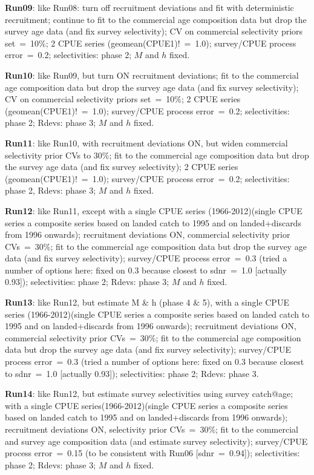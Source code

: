 {\bf Run09}: like Run08: turn off recruitment deviations and fit with deterministic recruitment; continue to fit to the commercial age composition data but drop the survey age data (and fix survey selectivity); CV on commercial selectivity priors set~=~10\%; 2 CPUE series (geomean(CPUE1)!~=~1.0); survey/CPUE process error~=~0.2; selectivities: phase 2; $M$ and $h$ fixed. \newline

{\bf Run10}: like Run09, but turn ON recruitment deviations; fit to the commercial age composition data but drop the survey age data (and fix survey selectivity); CV on commercial selectivity priors set~=~10\%; 2 CPUE series (geomean(CPUE1)!~=~1.0); survey/CPUE process error~=~0.2; selectivities: phase 2; Rdevs: phase 3; $M$ and $h$ fixed. \newline

{\bf Run11}: like Run10, with recruitment deviations ON, but widen commercial selectivity prior CVs to 30\%; fit to the commercial age composition data but drop the survey age data (and fix survey selectivity); 2 CPUE series (geomean(CPUE1)!~=~1.0); survey/CPUE process error~=~0.2; selectivities: phase 2, Rdevs: phase 3; $M$ and $h$ fixed. \newline

{\bf Run12}: like Run11, except with a single CPUE series (1966-2012)(single CPUE series a composite series based on landed catch to 1995 and on landed+discards from 1996 onwards); recruitment deviations ON, commercial selectivity prior CVs~=~30\%; fit to the commercial age composition data but drop the survey age data (and fix survey selectivity); survey/CPUE process error~=~0.3 (tried a number of options here: fixed on 0.3 because closest to sdnr~=~1.0 [actually 0.93]); selectivities: phase 2; Rdevs: phase 3; $M$ and $h$ fixed. \newline

{\bf Run13}: like Run12, but estimate M \& h (phase 4 \& 5), with a single CPUE series (1966-2012)(single CPUE series a composite series based on landed catch to 1995 and on landed+discards from 1996 onwards); recruitment deviations ON, commercial selectivity prior CVs~=~30\%; fit to the commercial age composition data but drop the survey age data (and fix survey selectivity); survey/CPUE process error~=~0.3 (tried a number of options here: fixed on 0.3 because closest to sdnr~=~1.0 [actually 0.93]); selectivities: phase 2; Rdevs: phase 3. \newline

{\bf Run14}: like Run12, but estimate survey selectivities using survey catch@age; with a single CPUE series(1966-2012)(single CPUE series a composite series based on landed catch to 1995 and on landed+discards from 1996 onwards); recruitment deviations ON, selectivity prior CVs~=~30\%; fit to the commercial and survey age composition data (and estimate survey selectivity); survey/CPUE process error~=~0.15 (to be consistent with Run06 [sdnr~=~0.94]); selectivities: phase 2; Rdevs: phase 3; $M$ and $h$ fixed. \newline

